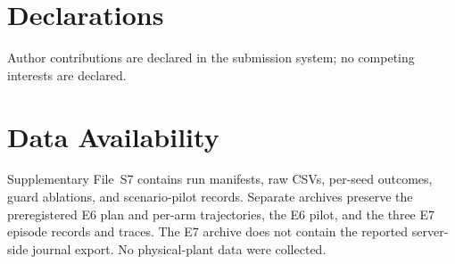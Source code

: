 \documentclass[journal]{IEEEtran}
\begin{document}








\section*{Declarations}
Author contributions are declared in the submission system; no competing
interests are declared.

\section*{Data Availability}
Supplementary File~S7 contains run manifests, raw CSVs, per-seed outcomes, guard ablations, and scenario-pilot records. Separate archives preserve the preregistered E6 plan and per-arm trajectories, the E6 pilot, and the three E7 episode records and traces. The E7 archive does not contain the reported server-side journal export. No physical-plant data were collected.



\end{document}
